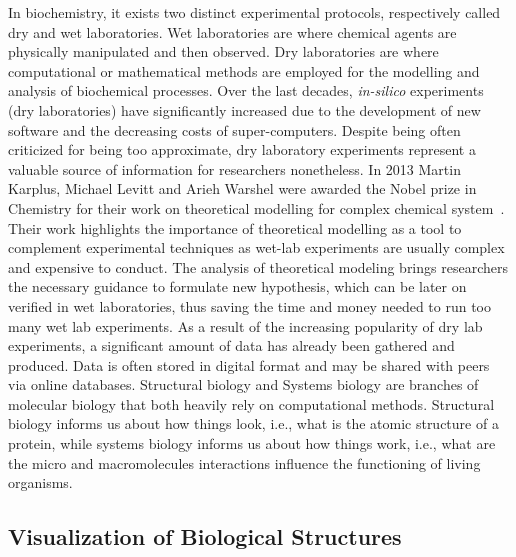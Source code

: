 In biochemistry, it exists two distinct experimental protocols, respectively called dry and wet laboratories.
Wet laboratories are where chemical agents are physically manipulated and then observed.
Dry laboratories are where computational or mathematical methods are employed for the modelling and analysis of biochemical processes. 
Over the last decades, \textit{in-silico} experiments (dry laboratories) have significantly increased due to the development of new software and the decreasing costs of super-computers.
Despite being often criticized for being too approximate, dry laboratory experiments represent a valuable source of information for researchers nonetheless.
In 2013 Martin Karplus, Michael Levitt and Arieh Warshel were awarded the Nobel prize in Chemistry for their work on theoretical modelling for complex chemical system~\cite{karplus2014development}.
Their work highlights the importance of theoretical modelling as a tool to complement experimental techniques as wet-lab experiments are usually complex and expensive to conduct.
The analysis of theoretical modeling brings researchers the necessary guidance to formulate new hypothesis, which can be later on verified in wet laboratories, thus saving the time and money needed to run too many wet lab experiments.
As a result of the increasing popularity of dry lab experiments, a significant amount of data has already been gathered and produced.
Data is often stored in digital format and may be shared with peers via online databases.
Structural biology and Systems biology are branches of molecular biology that both heavily rely on computational methods.
Structural biology informs us about how things look, i.e., what is the atomic structure of a protein, while systems biology informs us about how things work, i.e., what are the micro and macromolecules interactions influence the functioning of living organisms.

\subsection{Visualization of Biological Structures}


